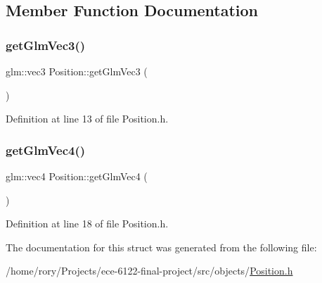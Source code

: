 \subsection{Member Function Documentation}
\mbox{\label{struct_position_aaccc6084d199c1f5fd4a325df73caff8}} 
\subsubsection{\texorpdfstring{get\+Glm\+Vec3()}{getGlmVec3()}}
{\footnotesize\ttfamily glm\+::vec3 Position\+::get\+Glm\+Vec3 (\begin{DoxyParamCaption}{ }\end{DoxyParamCaption})\hspace{0.3cm}{\ttfamily [inline]}}



Definition at line 13 of file Position.\+h.

\mbox{\label{struct_position_a25a2270a1b1e0a97f0aa3a0ed37c5007}} 
\subsubsection{\texorpdfstring{get\+Glm\+Vec4()}{getGlmVec4()}}
{\footnotesize\ttfamily glm\+::vec4 Position\+::get\+Glm\+Vec4 (\begin{DoxyParamCaption}{ }\end{DoxyParamCaption})\hspace{0.3cm}{\ttfamily [inline]}}



Definition at line 18 of file Position.\+h.



The documentation for this struct was generated from the following file\+:\begin{DoxyCompactItemize}
\item 
/home/rory/\+Projects/ece-\/6122-\/final-\/project/src/objects/\hyperlink{_position_8h}{Position.\+h}\end{DoxyCompactItemize}
